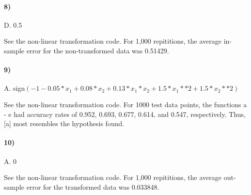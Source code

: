 \documentclass[10pt,letter]{article}
\begin{document}
\paragraph{8)} D. 0.5

	See the non-linear transformation code. For 1,000 repititions, the average in-sample error for the non-transformed data was 0.51429. 

\paragraph{9)} A. sign$(-1 - 0.05*x_1 + 0.08*x_2 + 0.13*x_1*x_2 + 1.5*x_1**2 + 1.5*x_2**2)$

	See the non-linear transformation code. For 1000 test data points, the functions a - e had accuracy rates of 0.952, 0.693, 0.677, 0.614, and 0.547, respectively. Thus, [a] most resembles the hypothesis found.

\paragraph{10)} A. 0

	See the non-linear transformation code. For 1,000 repititions, the average out-sample error for the transformed data was 0.033848.
\end{document}
